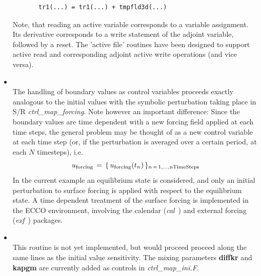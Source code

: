 \begin{itemize}
\begin{verbatim}
       tr1(...) = tr1(...) + tmpfld3d(...)
\end{verbatim}
%
Note, that reading an active variable corresponds
to a variable assignment. Its derivative corresponds
to a write statement of the adjoint variable, followed by
a reset.
The 'active file' routines have been designed
to support active read and corresponding adjoint active write
operations (and vice versa).
%
\item 
{}
\\
%
The handling of boundary values as control variables
proceeds exactly analogous to the initial values
with the symbolic perturbation taking place in S/R
{\it ctrl\_map\_forcing}.
Note however an important difference:
Since the boundary values are time dependent with a new
forcing field applied at each time steps,
the general problem may be thought of as
a new control variable at each time step
(or, if the perturbation is averaged over a certain period,
at each $ N $ timesteps), i.e.
\[
u_{\rm forcing} \, = \,
\{ \, u_{\rm forcing} ( t_n ) \, \}_{
n \, = \, 1, \ldots , {\rm nTimeSteps} }
\]
%
In the current example an equilibrium state is considered,
and only an initial perturbation to
surface forcing is applied with respect to the
equilibrium state.
A time dependent treatment of the surface forcing is 
implemented in the ECCO environment, involving the
calendar ({\it cal}~) and external forcing ({\it exf}~) packages.
%
\item 
{}
\\
%
This routine is not yet implemented, but would proceed
proceed along the same lines as the initial value sensitivity.
The mixing parameters {\bf diffkr} and {\bf kapgm}
are currently added as controls in {\it ctrl\_map\_ini.F}.
%
\end{itemize}
%

